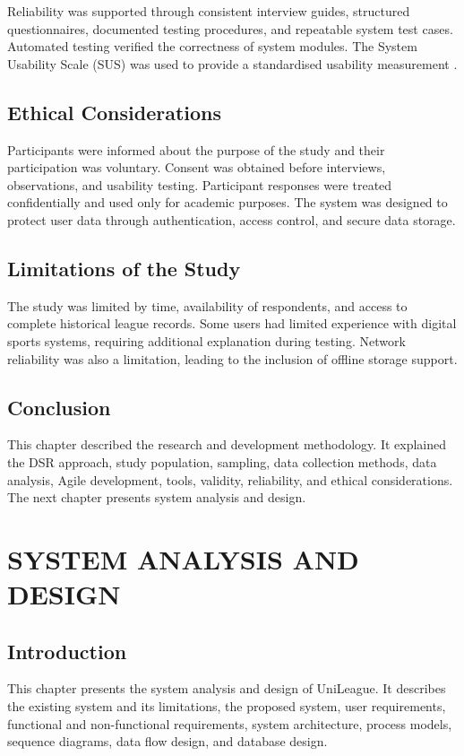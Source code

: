 \documentclass[12pt,a4paper]{report}
\begin{document}
Reliability was supported through consistent interview guides, structured questionnaires,
documented testing procedures, and repeatable system test cases. Automated testing verified
the correctness of system modules. The System Usability Scale (SUS) was used to provide a
standardised usability measurement \cite{brooke1996}.

\section{Ethical Considerations}
Participants were informed about the purpose of the study and their participation was voluntary.
Consent was obtained before interviews, observations, and usability testing. Participant
responses were treated confidentially and used only for academic purposes. The system was
designed to protect user data through authentication, access control, and secure data storage.

\section{Limitations of the Study}
The study was limited by time, availability of respondents, and access to complete historical
league records. Some users had limited experience with digital sports systems, requiring
additional explanation during testing. Network reliability was also a limitation, leading to
the inclusion of offline storage support.

\section{Conclusion}
This chapter described the research and development methodology. It explained the DSR approach,
study population, sampling, data collection methods, data analysis, Agile development, tools,
validity, reliability, and ethical considerations. The next chapter presents system analysis
and design.

\chapter{SYSTEM ANALYSIS AND DESIGN}
\section{Introduction}
This chapter presents the system analysis and design of UniLeague. It describes the existing
system and its limitations, the proposed system, user requirements, functional and non-functional
requirements, system architecture, process models, sequence diagrams, data flow design, and
database design.
\end{document}
